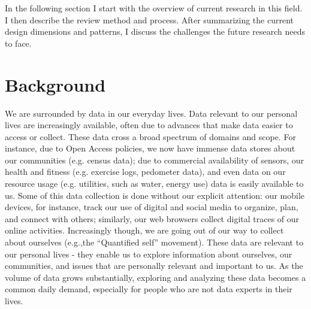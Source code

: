 \documentclass[12pt,oneside]{book}
\begin{document}
In the following section I start with the overview of current research in this field.  I then describe the review method and process.  After summarizing the current design dimensions and patterns, I discuss the challenges the future research needs to face.

\section{Background}

We are surrounded by data in our everyday lives. Data relevant to our personal lives are increasingly available, often due to advances that make data easier to access or collect.  These data cross a broad spectrum of domains and scope.  For instance, due to Open Access policies, we now have immense data stores about our communities (e.g. census data); due to commercial availability of sensors, our health and fitness (e.g. exercise logs, pedometer data), and even data on our resource usage (e.g. utilities, such as water, energy use) data is easily available to us.  Some of this data collection is done without our explicit attention: our mobile devices, for instance, track our use of digital and social media to organize, plan, and connect with others; similarly, our web browsers collect digital traces of our online activities.  Increasingly though, we are going out of our way to collect about ourselves (e.g.,the ``Quantified self'' movement).  These data are relevant to our personal lives - they enable us to explore information about ourselves, our communities, and issues that are personally relevant and important to us.  As the volume of data grows substantially, exploring and analyzing these data becomes a common daily demand, especially for people who are not data experts in their lives. 


\end{document}
